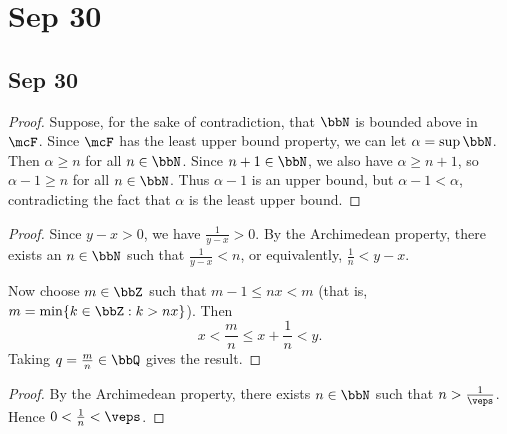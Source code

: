 \chapter{Sep 30}
\clearpage
\section{Sep 30}

\begin{proof}
    Suppose, for the sake of contradiction, that $\bbN$ is bounded above in $\mcF$. Since $\mcF$ has the least upper bound property, we can let $\alpha = \sup \bbN$. Then $\alpha \ge n$ for all $n \in \bbN$. Since $n+1 \in \bbN$, we also have $\alpha \ge n+1$, so $\alpha-1 \ge n$ for all $n \in \bbN$. Thus $\alpha-1$ is an upper bound, but $\alpha-1 < \alpha$, contradicting the fact that $\alpha$ is the least upper bound.
\end{proof}


\begin{proof}
    Since $y-x > 0$, we have $\frac{1}{y-x} > 0$. By the Archimedean property, there exists an $n \in \bbN$ such that $\frac{1}{y-x} < n$, or equivalently, $\frac{1}{n} < y-x$.

    Now choose $m \in \bbZ$ such that $m-1 \le nx < m$ (that is, $m = \min\{k \in \bbZ : k > nx\}$). Then
    \[
        x < \frac{m}{n} \le x + \frac{1}{n} < y.
    \]
    Taking $q = \frac{m}{n} \in \bbQ$ gives the result.
\end{proof}

\begin{proof}
    By the Archimedean property, there exists $n \in \bbN$ such that $n > \frac{1}{\veps}$. Hence $0 < \frac{1}{n} < \veps$.
\end{proof}


